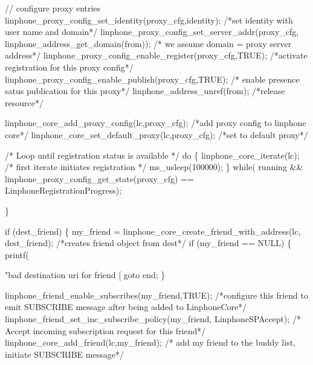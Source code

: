 \begin{DoxyCodeInclude}
{{{{                \textcolor{comment}{// configure proxy entries}
                linphone_proxy_config_set_identity(proxy\_cfg,identity); \textcolor{comment}{/*set identity with user name and
       domain*/}
                linphone_proxy_config_set_server_addr(proxy\_cfg,
      linphone_address_get_domain(from)); \textcolor{comment}{/* we assume domain = proxy server address*/}
                linphone_proxy_config_enable_register(proxy\_cfg,TRUE); \textcolor{comment}{/*activate registration for this
       proxy config*/}
                linphone_proxy_config_enable_publish(proxy\_cfg,TRUE); \textcolor{comment}{/* enable presence satus publication
       for this proxy*/}
                linphone_address_unref(from); \textcolor{comment}{/*release resource*/}

                linphone_core_add_proxy_config(lc,proxy\_cfg); \textcolor{comment}{/*add proxy config to linphone core*/}
                linphone_core_set_default_proxy(lc,proxy\_cfg); \textcolor{comment}{/*set to default proxy*/}


                \textcolor{comment}{/* Loop until registration status is available */}
                \textcolor{keywordflow}{do} \{
                        linphone_core_iterate(lc); \textcolor{comment}{/* first iterate initiates registration */}
                        ms\_usleep(100000);
                \}
                \textcolor{keywordflow}{while}(  running && linphone_proxy_config_get_state(proxy\_cfg) == 
      LinphoneRegistrationProgress);

        \}

        \textcolor{keywordflow}{if} (dest\_friend) \{
                my\_friend = linphone_core_create_friend_with_address(lc, dest\_friend); \textcolor{comment}{/*creates friend
       object from dest*/}
                \textcolor{keywordflow}{if} (my\_friend == NULL) \{
                        printf(\textcolor{stringliteral}{"bad destination uri for friend [%
                        \textcolor{keywordflow}{goto} end;
                \}

                linphone_friend_enable_subscribes(my\_friend,TRUE); \textcolor{comment}{/*configure this friend to emit
       SUBSCRIBE message after being added to LinphoneCore*/}
                linphone_friend_set_inc_subscribe_policy(my\_friend,
      LinphoneSPAccept); \textcolor{comment}{/* Accept incoming subscription request for this friend*/}
                linphone_core_add_friend(lc,my\_friend); \textcolor{comment}{/* add my friend to the buddy list, initiate
       SUBSCRIBE message*/}

}}}}}
\end{DoxyCodeInclude}
